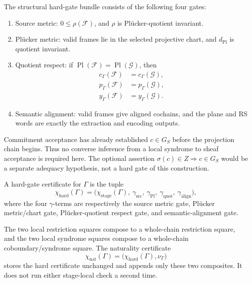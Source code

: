 The structural hard-gate bundle consists of the following four gates:
\begin{enumerate}[label=(\roman*)]
  \item Source metric: \(0\le\rho(\mathcal F)\), and \(\rho\) is
    Pl\"ucker-quotient invariant.
  \item Pl\"ucker metric: valid frames lie in the selected projective chart,
    and \(d_{\mathrm{Pl}}\) is quotient invariant.
  \item Quotient respect: if
    \(\operatorname{Pl}(\mathcal F)=\operatorname{Pl}(\mathcal G)\), then
    \[
    \begin{aligned}
      c_\Gamma(\mathcal F)&=c_\Gamma(\mathcal G),\\
      p_\Gamma(\mathcal F)&=p_\Gamma(\mathcal G),\\
      y_\Gamma(\mathcal F)&=y_\Gamma(\mathcal G).
    \end{aligned}
    \]
  \item Semantic alignment: valid frames give aligned cochains, and the
    plane and RS words are exactly the extraction and encoding outputs.
\end{enumerate}

Commitment acceptance has already established \(c\in G_S\) before the
projection chain begins.  Thus no converse inference from a local syndrome to
sheaf acceptance is required here.  The optional assertion
\(\sigma(c)\in Z\Rightarrow c\in G_S\) would be a separate adequacy hypothesis,
not a hard gate of this construction.

\begin{definition}\label{def:hard-gate-certificate}
A hard-gate certificate for \(\Gamma\) is the tuple
\[
  \chi_{\mathrm{hard}}(\Gamma)
  =
  \bigl(
    \chi_{\mathrm{stage}}(\Gamma),\
    \gamma_{\mathrm{src}},\
    \gamma_{\mathrm{Pl}},\
    \gamma_{\mathrm{quot}},\
    \gamma_{\mathrm{align}}
  \bigr),
\]
where the four \(\gamma\)-terms are respectively the source metric gate,
Pl\"ucker metric/chart gate, Pl\"ucker-quotient respect gate, and
semantic-alignment gate.
\end{definition}

The two local restriction squares compose to a whole-chain restriction square,
and the two local syndrome squares compose to a whole-chain
coboundary/syndrome square.  The naturality certificate
\[
  \chi_{\mathrm{nat}}(\Gamma)
  =\bigl(\chi_{\mathrm{hard}}(\Gamma),\nu_\Gamma\bigr)
\]
stores the hard certificate unchanged and appends only these two composites.
It does not run either stage-local check a second time.


